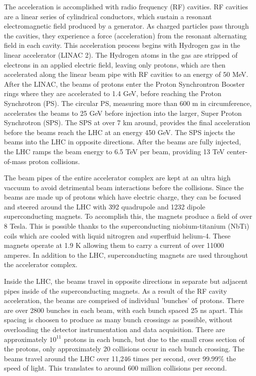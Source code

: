 The acceleration is accomplished with radio frequency (RF) cavities. RF cavities are a linear series of cylindrical conductors,
which sustain a resonant electromagnetic field produced by a generator. As 
charged particles pass through the cavities, they experience a force
(acceleration) from the resonant alternating field in each cavity. This acceleration process begins with Hydrogen gas in the linear accelerator
(LINAC 2). The Hydrogen atoms in the gas are stripped of electrons
in an applied electric field, leaving only protons, which are then accelerated
along the linear beam pipe with RF cavities to an energy of 50 MeV. After the LINAC, the beams of protons enter the Proton Synchrontron Booster rings where
they are accelerated to 1.4 GeV, before reaching the Proton
Synchrotron (PS). The circular PS, measuring more than 600 m
in circumference, accelerates the beams to 25 GeV before injection into the
larger, Super Proton Synchrotron (SPS). The SPS at over 7 km around, provides the final
acceleration before the beams reach the LHC at an energy 450 GeV. The SPS injects the beams into
the LHC in opposite directions. After the beams are fully injected, the LHC ramps the beam energy to 6.5 TeV per beam, providing 13 TeV center-of-mass proton collisions.

The beam pipes of the entire accelerator complex are kept at an ultra high vaccuum
to avoid detrimental beam interactions before the collisions. Since the beams are made up of protons which have electric charge,
they can be focused and steered around the LHC with 392 quadrupole and 1232 dipole superconducting magnets.
To accomplish this, the magnets produce a field of over 8 Tesla. This is possible thanks to the
superconducting niobium-titanium (NbTi) coils which are cooled with liquid nitrogren and superfluid helium-4. These
magnets operate at 1.9 K allowing them to carry a current of over 11000 amperes. In addition to
the LHC, superconducting magnets are used throughout the accelerator complex.

Inside the LHC, the beams travel in opposite directions in separate but adjacent pipes inside of the superconducting magnets.
As a result of the RF cavity acceleration, the beams are comprised of individual 'bunches' of protons.
There are over 2800 bunches in each beam, with each bunch spaced 25 ns apart. This spacing is choosen to
produce as many bunch crossings as possible, without overloading
the detector instrumentation and data acquisition. There are approximately $10^{11}$ protons in each bunch, but due to the small cross section of the protons,
only approximately 20 collisions occur in each bunch crossing. The beams travel around the LHC over 11,246 times per second, over 99.99$\%$ the speed of light. 
This translates to around 600 million collisions per second.

